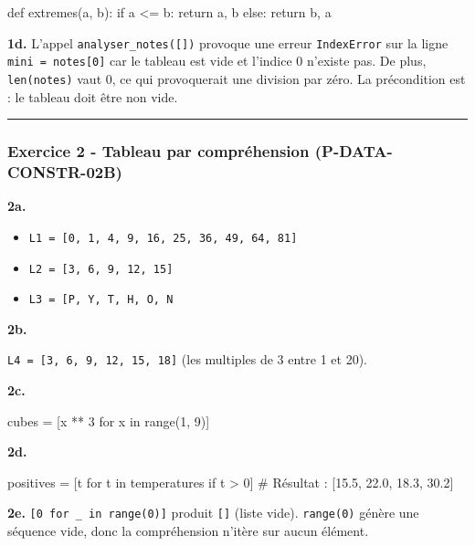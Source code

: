 \begin{python}
def extremes(a, b):
    if a <= b:
        return a, b
    else:
        return b, a
\end{python}

\textbf{1d.} L'appel \texttt{analyser\_notes({[}{]})} provoque une
erreur \texttt{IndexError} sur la ligne \texttt{mini\ =\ notes{[}0{]}}
car le tableau est vide et l'indice 0 n'existe pas. De plus,
\texttt{len(notes)} vaut 0, ce qui provoquerait une division par zéro.
La précondition est : le tableau doit être non vide.

\begin{center}\rule{0.5\linewidth}{0.5pt}\end{center}

\subsubsection{Exercice 2 - Tableau par compréhension (P-DATA-CONSTR-02B)}

\textbf{2a.}

\begin{itemize}
\tightlist
\item
  \texttt{L1\ =\ {[}0,\ 1,\ 4,\ 9,\ 16,\ 25,\ 36,\ 49,\ 64,\ 81{]}}
\item
  \texttt{L2\ =\ {[}3,\ 6,\ 9,\ 12,\ 15{]}}
\item
  \texttt{L3\ =\ {[}\textquotesingle{}P\textquotesingle{},\ \textquotesingle{}Y\textquotesingle{},\ \textquotesingle{}T\textquotesingle{},\ \textquotesingle{}H\textquotesingle{},\ \textquotesingle{}O\textquotesingle{},\ \textquotesingle{}N\textquotesingle{}{]}}
\end{itemize}

\textbf{2b.}

\texttt{L4\ =\ {[}3,\ 6,\ 9,\ 12,\ 15,\ 18{]}} (les multiples de 3 entre
1 et 20).

\textbf{2c.}

\begin{python}
cubes = [x ** 3 for x in range(1, 9)]
\end{python}

\textbf{2d.}

\begin{python}
positives = [t for t in temperatures if t > 0]
# Résultat : [15.5, 22.0, 18.3, 30.2]
\end{python}

\textbf{2e.} \texttt{{[}0\ for\ \_\ in\ range(0){]}} produit
\texttt{{[}{]}} (liste vide). \texttt{range(0)} génère une séquence
vide, donc la compréhension n'itère sur aucun élément.


